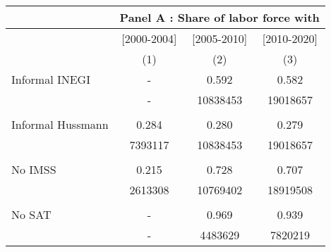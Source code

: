 \begin{tabular}{rccc}
\toprule
      & \multicolumn{3}{c}{Panel A : Share of labor force with} \\
\midrule
      & [2000-2004] & [2005-2010] & [2010-2020] \\
\midrule
\multicolumn{1}{l}{} & (1)   & (2)   & (3) \\
\midrule
\midrule
\multicolumn{1}{l}{Informal INEGI} & -     & 0.592 & 0.582 \\
      & -     & 10838453 & 19018657 \\
      &       &       &  \\
\multicolumn{1}{l}{Informal Hussmann} & 0.284 & 0.280 & 0.279 \\
      & 7393117 & 10838453 & 19018657 \\
      &       &       &  \\
\multicolumn{1}{l}{No IMSS} & 0.215 & 0.728 & 0.707 \\
      & 2613308 & 10769402 & 18919508 \\
      &       &       &  \\
\multicolumn{1}{l}{No SAT} & -     & 0.969 & 0.939 \\
      & -     & 4483629 & 7820219 \\
\bottomrule
\bottomrule
\end{tabular}%
